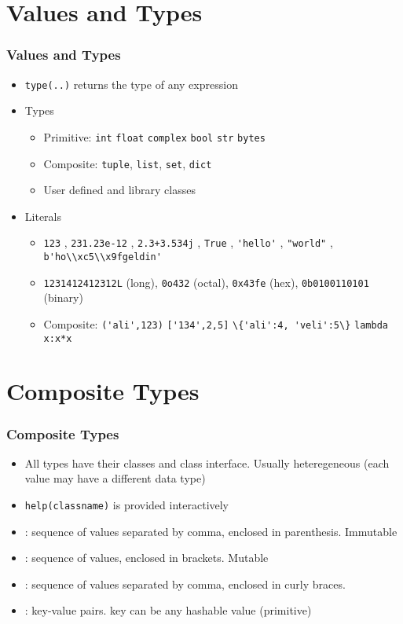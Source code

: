 \documentclass[trans,compress,xcolor=table]{beamer}
\begin{document}
\section{Values and Types}
\begin{frame}
\frametitle{Values and Types}
\begin{itemize}
\item \lstinline!type(..)! returns the type of any expression
\item Types
	\begin{itemize}
	\item Primitive: \lstinline!int! \lstinline!float! \lstinline!complex! \lstinline!bool! \lstinline!str! \lstinline!bytes!
	\item Composite: \lstinline!tuple!, \lstinline!list!, \lstinline!set!, \lstinline!dict!
	\item User defined and library classes
	\end{itemize}
\item Literals
	\begin{itemize}
		\item \lstinline!123! , \lstinline!231.23e-12! ,  \lstinline!2.3+3.534j!  , \lstinline!True!   , \lstinline!'hello'!  , \lstinline!"world"!  , \lstinline!b'ho\\xc5\\x9fgeldin'!
		\item \lstinline!1231412412312L! (long), \lstinline!0o432! (octal), \lstinline!0x43fe! (hex),
			\lstinline!0b0100110101! (binary)
		\item Composite: \lstinline!('ali',123)! \lstinline!['134',2,5]! \lstinline!\{'ali':4, 'veli':5\}! \lstinline!lambda x:x*x!
	\end{itemize}
\end{itemize}
\end{frame}

\section{Composite Types}
\begin{frame}
\frametitle{Composite Types}
\begin{itemize}
\item All types have their classes and class interface. Usually heteregeneous (each value may have a different data type)
\item \lstinline!help(classname)! is provided interactively
\item {}: sequence of values separated by comma, enclosed in parenthesis. Immutable
\item {}: sequence of values, enclosed in brackets. Mutable
\item {}:  sequence of values separated by comma, enclosed in curly braces.
\item {}: key-value pairs. key can be any hashable value (primitive)
\end{itemize}
\end{frame}
\end{document}
